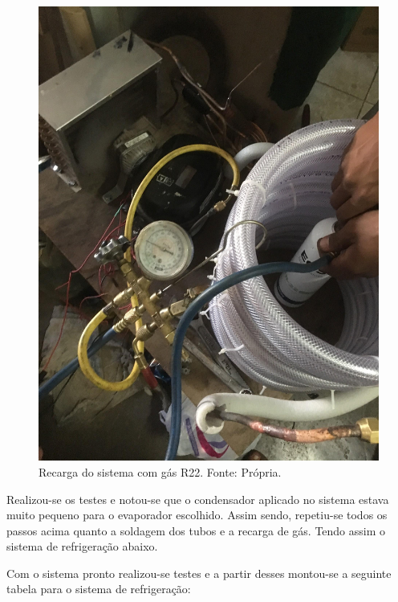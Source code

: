                         \begin{figure}[!htb]
                            \centering
                            \includegraphics[scale= 0.2]{figuras/recarga-gas.png}
                            \caption{Recarga do sistema com gás R22. Fonte: Própria.}
                            \label{recarga-gas}
                        \end{figure}

                        Realizou-se os testes e notou-se que o condensador aplicado no sistema estava muito
                        pequeno para o evaporador escolhido. Assim sendo, repetiu-se todos os passos
                        acima quanto a soldagem dos tubos e a recarga de gás. Tendo assim o sistema de
                        refrigeração abaixo. 

                        Com o sistema pronto realizou-se testes e a partir desses montou-se a seguinte tabela
                        para o sistema de refrigeração: 

